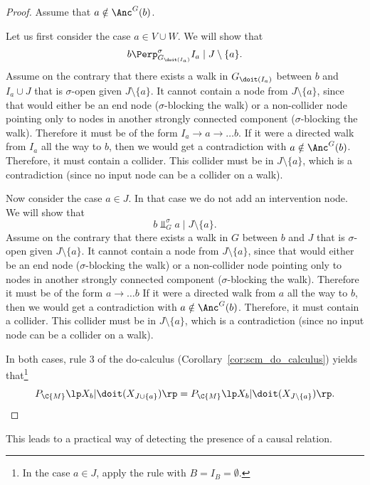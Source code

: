 \begin{proof}
  Assume that $a \notin \Anc^G(b)$. 
  
  Let us first consider the case $a \in V \cup W$. We will show that
  $$b \Perp^\sigma_{G_{\doit(I_a)}} I_a \mid J \setminus \{a\}.$$
  Assume on the contrary that there exists a walk in $G_{\doit(I_a)}$ between $b$ and $I_a \cup J$ that is $\sigma$-open given $J \setminus \{a\}$. 
  It cannot contain a node from $J \setminus \{a\}$, since that would either be an end node ($\sigma$-blocking the walk) or a non-collider node pointing only to nodes in another strongly connected component ($\sigma$-blocking the walk).
  Therefore it must be of the form $I_a \to a \to \dots b$.
  If it were a directed walk from $I_a$ all the way to $b$, then we would get a contradiction with $a \notin \Anc^G(b)$.
  Therefore, it must contain a collider.
  This collider must be in $J \setminus \{a\}$, which is a contradiction (since no input node can be a collider on a walk).

  Now consider the case $a \in J$. In that case we do not add an intervention node. We will show that
  $$b \Perp^\sigma_{G} a \mid J \setminus \{a\}.$$
  Assume on the contrary that there exists a walk in $G$ between $b$ and $J$ that is $\sigma$-open given $J \setminus \{a\}$. 
  It cannot contain a node from $J \setminus \{a\}$, since that would either be an end node ($\sigma$-blocking the walk) or a non-collider node pointing only to nodes in another strongly connected component ($\sigma$-blocking the walk).
  Therefore it must be of the form $a \to \dots b$ 
  If it were a directed walk from $a$ all the way to $b$, then we would get a contradiction with $a \notin \Anc^G(b)$.
  Therefore, it must contain a collider.
  This collider must be in $J \setminus \{a\}$, which is a contradiction (since no input node can be a collider on a walk).

  In both cases, rule 3 of the do-calculus (Corollary~\ref{cor:scm_do_calculus}) yields that\footnote{In the case $a \in J$, apply the rule with $B = I_B = \emptyset$.}
    \[ P_{\C{M}}\lp X_b|\doit(X_{J\cup \{a\}}) \rp = P_{\C{M}}\lp X_b|\doit(X_{J\setminus\{a\}}) \rp.\]
\end{proof}
This leads to a practical way of detecting the presence of a causal relation.

